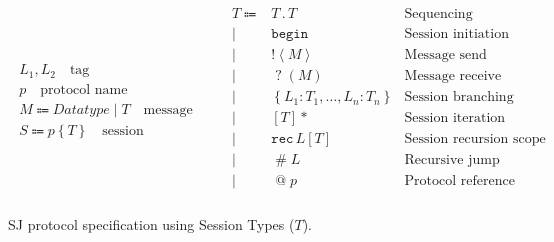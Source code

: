 \documentclass[10pt]{llncs}
\begin{document}
\begin{figure}
\begin{gather*}
\begin{array}{c}
L_1, L_2\quad\mbox{tag}
\\[10pt]
p\quad\mbox{protocol name}
\\[10pt]
M \Coloneqq \textit{Datatype} \mid T \quad\mbox{message}
\\[10pt]
S \Coloneqq  p\left\{ T \right\} \quad \mbox{session}
\end{array}
\qquad
\begin{array}{rlr}
T \Coloneqq & T\mathbin{.}T & \mbox{Sequencing} \\ 
       \mid & \texttt{begin} & \mbox{Session initiation} \\
       \mid & \mathopen{!}\left<M\right> & \mbox{Message send} \\ 
       \mid & \mathopen{?}\left(M\right) & \mbox{Message receive} \\
       \mid & \left\{L_1 \colon T_1,\dots, L_n \colon T_n \right\} & \mbox{Session branching} \\ %
       \mid & \left[T\right]* & \mbox{Session iteration} \\ 
       \mid & \texttt{rec}\,L\left[T\right] & \mbox{Session recursion scope} \\ 
       \mid & \mathopen{\#}L & \mbox{Recursive jump} \\ 
       \mid & \mathopen{@}p & \mbox{Protocol reference} \\
\end{array}
\end{gather*}
\caption{SJ protocol specification using Session Types ($T$).}\label{tab:prot-spec} 
\end{figure}

\end{document}
